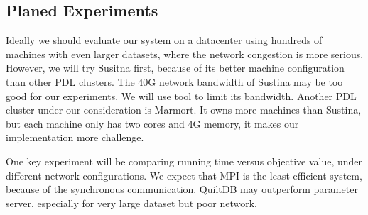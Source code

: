 \documentclass[11pt, twocolumn]{article}
\begin{document}
\subsection{Planed Experiments}

Ideally we should evaluate our system on a datacenter using hundreds of
machines with even larger datasets, where the network congestion is more
serious. However, we will try Susitna first, because of its better machine
configuration than other PDL clusters. The 40G network bandwidth of Sustina may
be too good for our experiments. We will use tool to limit its
bandwidth. Another PDL cluster under our consideration is Marmort. It owns more
machines than Sustina, but each machine only has two cores and 4G memory, it
makes our implementation more challenge.

One key experiment will be comparing running time versus objective value, under
different network configurations. We expect that MPI is the least efficient
system, because of the synchronous communication. QuiltDB may outperform
parameter server, especially for very large dataset but poor network.



%


\end{document}
